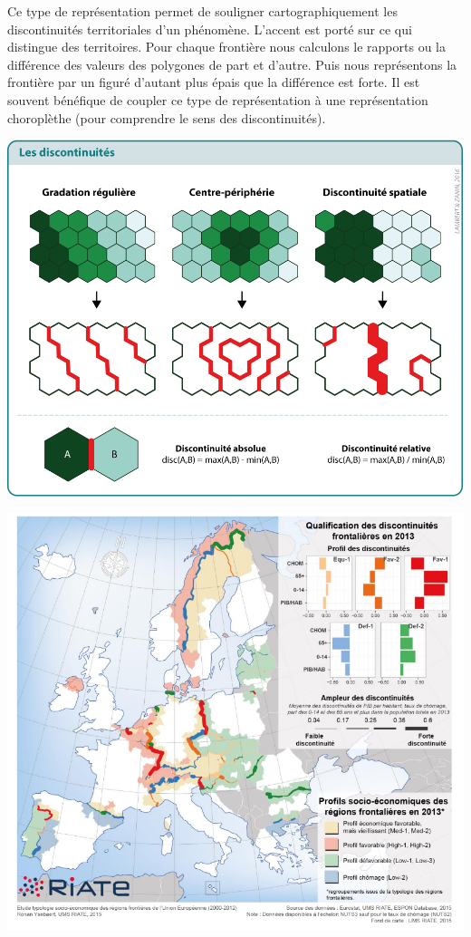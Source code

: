\documentclass[]{book}
\begin{document}
Ce type de représentation permet de souligner cartographiquement les
discontinuités territoriales d'un phénomène. L'accent est porté sur ce
qui distingue des territoires. Pour chaque frontière nous calculons le
rapports ou la différence des valeurs des polygones de part et d'autre.
Puis nous représentons la frontière par un figuré d'autant plus épais
que la différence est forte. Il est souvent bénéfique de coupler ce type
de représentation à une représentation choroplèthe (pour comprendre le
sens des discontinuités).

\begin{center}\includegraphics[width=13.89in]{img/discmet} \end{center}

\begin{center}\includegraphics[width=11.67in]{img/disc2} \end{center}
\end{document}
